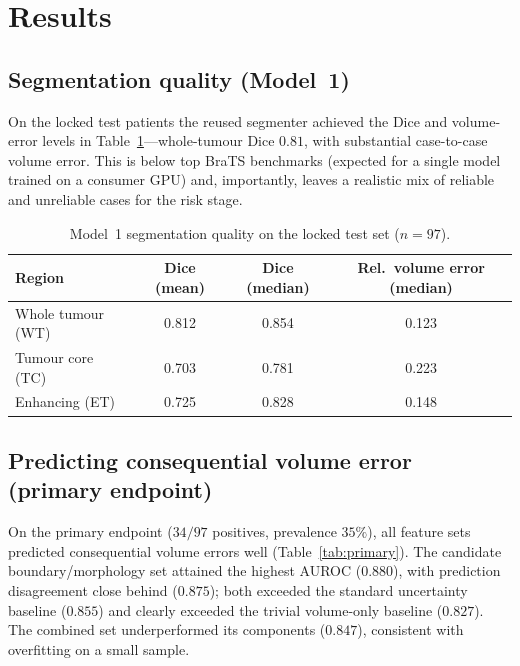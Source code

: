 \documentclass[11pt]{article}
\begin{document}
\section{Results}

\subsection{Segmentation quality (Model~1)}
On the locked test patients the reused segmenter achieved the Dice and volume-error
levels in Table~\ref{tab:seg}---whole-tumour Dice $0.81$, with substantial case-to-case
volume error. This is below top BraTS benchmarks (expected for a single model trained on
a consumer GPU) and, importantly, leaves a realistic mix of reliable and unreliable
cases for the risk stage.

\begin{table}[htbp]
\centering
\caption{Model~1 segmentation quality on the locked test set ($n{=}97$).}
\label{tab:seg}
\begin{tabular}{lccc}
\toprule
Region & Dice (mean) & Dice (median) & Rel.\ volume error (median) \\
\midrule
Whole tumour (WT) & 0.812 & 0.854 & 0.123 \\
Tumour core (TC)  & 0.703 & 0.781 & 0.223 \\
Enhancing (ET)    & 0.725 & 0.828 & 0.148 \\
\bottomrule
\end{tabular}
\end{table}

\subsection{Predicting consequential volume error (primary endpoint)}
On the primary endpoint ($34/97$ positives, prevalence $35\%$), all feature sets
predicted consequential volume errors well (Table~\ref{tab:primary}). The candidate
boundary/morphology set attained the highest AUROC ($0.880$), with prediction
disagreement close behind ($0.875$); both exceeded the standard uncertainty baseline
($0.855$) and clearly exceeded the trivial volume-only baseline ($0.827$). The
\textsf{combined} set underperformed its components ($0.847$), consistent with
overfitting on a small sample.
\end{document}

